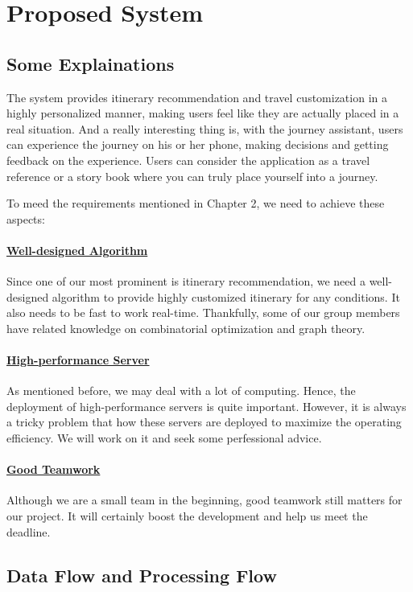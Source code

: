 \documentclass[10pt]{article}
\begin{document}
\section{Proposed System}
\subsection{Some Explainations}
The system provides itinerary recommendation and travel customization in a highly personalized manner, making users feel like they are actually placed in a real situation. And a really interesting thing is, with the journey assistant, users can experience the journey on his or her phone, making decisions and getting feedback on the experience. Users can consider the application as a travel reference or a story book where you can truly place yourself into a journey.

To meed the requirements mentioned in Chapter 2, we need to achieve these aspects:

\paragraph{\underline{Well-designed Algorithm}}
Since one of our most prominent is itinerary recommendation, we need a well-designed algorithm to provide highly customized itinerary for any conditions. It also needs to be fast to work real-time. Thankfully, some of our group members have related knowledge on combinatorial optimization and graph theory.

\paragraph{\underline{High-performance Server}}
As mentioned before, we may deal with a lot of computing. Hence, the deployment of high-performance servers is quite important. However, it is always a tricky problem that how these servers are deployed to maximize the operating efficiency. We will work on it and seek some perfessional advice.

\paragraph{\underline{Good Teamwork}}
Although we are a small team in the beginning, good teamwork still matters for our project. It will certainly boost the development and help us meet the deadline.

\subsection{Data Flow and Processing Flow}
\end{document}
